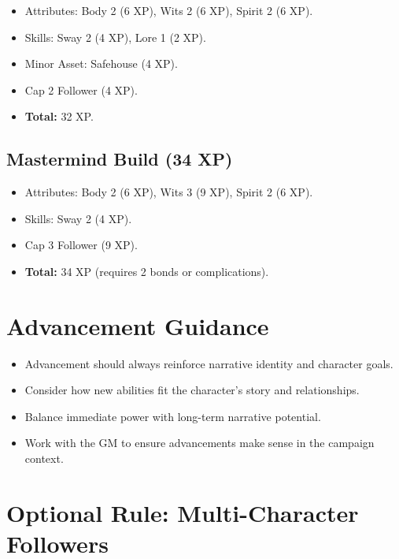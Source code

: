 \begin{itemize}
\item Attributes: Body 2 (6 XP), Wits 2 (6 XP), Spirit 2 (6 XP).
\item Skills: Sway 2 (4 XP), Lore 1 (2 XP).
\item Minor Asset: Safehouse (4 XP).
\item Cap 2 Follower (4 XP).
\item \textbf{Total:} 32 XP.
\end{itemize}

\subsection{Mastermind Build (34 XP)}
\label{subsec:mastermind-example}

\begin{itemize}
\item Attributes: Body 2 (6 XP), Wits 3 (9 XP), Spirit 2 (6 XP).
\item Skills: Sway 2 (4 XP).
\item Cap 3 Follower (9 XP).
\item \textbf{Total:} 34 XP (requires 2 bonds or complications).
\end{itemize}

\section{Advancement Guidance}
\label{sec:advancement-guidance}

\begin{itemize}
\item Advancement should always reinforce narrative identity and character goals.
\item Consider how new abilities fit the character's story and relationships.
\item Balance immediate power with long-term narrative potential.
\item Work with the GM to ensure advancements make sense in the campaign context.
\end{itemize}

\section{Optional Rule: Multi-Character Followers}
\label{sec:multi-character-followers}

